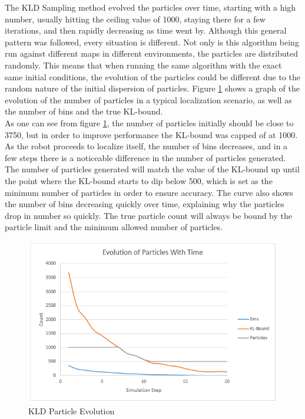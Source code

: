 \documentclass{article}
\begin{document}
The KLD Sampling method evolved the particles over time, starting with a high number, usually hitting the ceiling value of 1000, staying there for a few iterations, and then rapidly decreasing as time went by. Although this general pattern was followed, every situation is different. Not only is this algorithm being run against different maps in different environments, the particles are distributed randomly. This means that when running the same algorithm with the exact same initial conditions, the evolution of the particles could be different due to the random nature of the initial dispersion of particles. Figure \ref{fig:KLD-evolution} shows a graph of the evolution of the number of particles in a typical localization scenario, as well as the number of bins and the true KL-bound.\\

As one can see from figure \ref{fig:KLD-evolution}, the number of particles initially should be close to 3750, but in order to improve performance the KL-bound was capped of at 1000. As the robot proceeds to localize itself, the number of bins decreases, and in a few steps there is a noticeable difference in the number of particles generated. The number of particles generated will match the value of the KL-bound up until the point where the KL-bound starts to dip below 500, which is set as the minimum number of particles in order to ensure accuracy. The curve also shows the number of bins decreasing quickly over time, explaining why the particles drop in number so quickly. The true particle count will always be bound by the particle limit and the minimum allowed number of particles.

\begin{figure}[h!]
\centering
\includegraphics[scale=0.9]{KLD_Evo.PNG}
\caption{KLD Particle Evolution}
\label{fig:KLD-evolution}
\end{figure}
\end{document}
